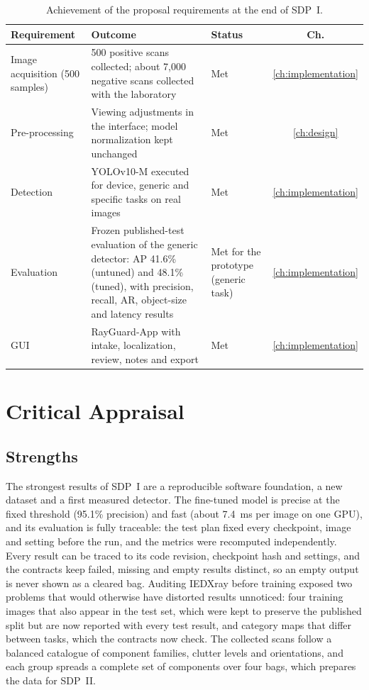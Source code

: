 \begin{table}[htbp]
\centering\tablesetup
\caption{Achievement of the proposal requirements at the end of SDP~I.}
\label{tab:achievement}
\begin{tabularx}{\textwidth}{@{}L{0.22\textwidth}YL{0.16\textwidth}c@{}}
\toprule
Requirement & Outcome & Status & Ch.\\
\midrule
Image acquisition (500 samples) & 500 positive scans collected; about 7,000
negative scans collected with the laboratory & Met &
\ref{ch:implementation}\\
Pre-processing & Viewing adjustments in the interface; model normalization kept
unchanged & Met & \ref{ch:design}\\
Detection & YOLOv10-M executed for device, generic and specific tasks on real
images & Met & \ref{ch:implementation}\\
Evaluation & Frozen published-test evaluation of the generic detector: AP 41.6\%
(untuned) and 48.1\% (tuned), with precision, recall, AR, object-size and latency results
& Met for the prototype (generic task) &
\ref{ch:implementation}\\
GUI & RayGuard-App with intake, localization, review, notes and export & Met &
\ref{ch:implementation}\\
\bottomrule
\end{tabularx}
\end{table}

\section{Critical Appraisal}\label{sec:appraisal}

\subsection{Strengths}
The strongest results of SDP~I are a reproducible software foundation, a new
dataset and a first measured detector. The fine-tuned model is precise at the
fixed threshold (95.1\% precision) and fast (about 7.4~ms per image on one GPU),
and its evaluation is fully traceable: the test plan fixed every checkpoint,
image and setting before the run, and the metrics were recomputed independently.
Every result can be traced to its code revision, checkpoint hash and settings,
and the contracts keep failed, missing and empty results distinct, so an empty
output is never shown as a cleared bag. Auditing IEDXray before training exposed
two problems that would otherwise have distorted results unnoticed: four training
images that also appear in the test set, which were kept to preserve the
published split but are now reported with every test result, and category maps
that differ between tasks, which the contracts now check. The collected scans follow a balanced catalogue of component families,
clutter levels and orientations, and each group spreads a complete set of
components over four bags, which prepares the data for SDP~II.

